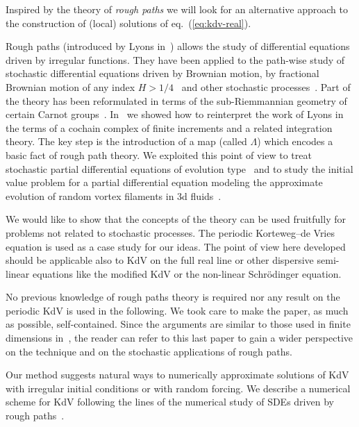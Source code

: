 \documentclass[a4paper,12pt,reqno]{article}
\begin{document}
Inspired by the theory of \emph{rough paths} we will look for an alternative approach to the
construction of (local) solutions of eq.~(\ref{eq:kdv-real}).  

Rough paths (introduced by Lyons in~\cite{MR1654527,MR2036784}) allows the study of differential
equations driven by irregular functions. They have been applied to the
path-wise study of stochastic differential equations driven by
Brownian motion, by fractional Brownian motion of any index $H>1/4$~\cite{MR1883719}
and other stochastic processes~\cite{MR2164030,fvsubell}. Part of the theory has been reformulated in terms of the sub-Riemmannian geometry of certain Carnot groups~\cite{fvgeo}. 
In~\cite{MR2091358} we showed how to reinterpret the work of Lyons in the terms of a
cochain complex of finite increments and a related integration
theory. The key step is the introduction of a map (called
$\Lambda$) which encodes a basic fact of rough path theory.
We exploited this point of view 
 to treat stochastic partial differential
equations of evolution type~\cite{youngspde,TindelGubinelli} and to
study the initial value problem for a partial differential  equation
modeling the approximate evolution of random vortex filaments in 3d
fluids~\cite{evolution}. 

We would like to show that the concepts of the theory can be used
fruitfully for problems not related to stochastic processes.
The periodic Korteweg--de Vries equation is used as a case study for our
ideas. The point of view here developed should be applicable also to KdV on
the full  real line or other dispersive semi-linear equations like the
modified KdV or the non-linear Schr\"odinger equation.  

No previous knowledge of rough paths theory is required nor any
 result on the periodic KdV is used in the following. We took care to
make the paper, as much as possible, self-contained. Since the
arguments are similar to those used in finite dimensions
in~\cite{MR2091358},  the reader can refer to this last paper to gain a wider perspective
on the technique and on the stochastic applications of rough paths. 

Our method suggests natural ways to numerically approximate
 solutions of KdV with irregular initial conditions or with random
 forcing. We describe a numerical scheme for KdV following the lines of the numerical study of SDEs driven by rough paths~\cite{davie,MR1470933,fveuler}.
\end{document}
